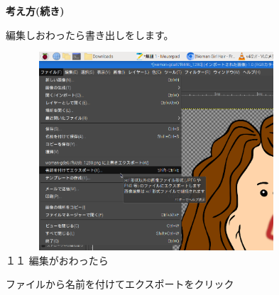 \documentclass[a4paper,12pt]{jarticle}
\begin{document}
\vfill
\clearpage
\begin{figure}
  \textbf{考え方(続き)}


  編集しおわったら書き出しをします。

  \centering
  \begin{minipage}{13.237cm}
    \includegraphics[width=13.178cm,height=7.408cm]{textbook-img138.png}\\
    １１ 編集がおわったら

    ファイルから名前を付けてエクスポートをクリック
  \end{minipage}

  \bigskip



\end{figure}
\end{document}

